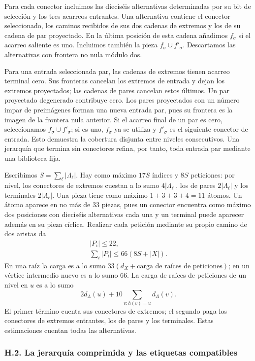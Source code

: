 \documentclass[spanish,11pt,a4paper]{article}
\begin{document}
Para cada conector incluimos las dieciséis alternativas determinadas por su bit de selección y los tres acarreos entrantes. Una alternativa contiene el conector seleccionado, los caminos recibidos de sus dos cadenas de extremos y los de su cadena de par proyectado. En la última posición de esta cadena añadimos \(f_\sigma\) si el acarreo saliente es uno. Incluimos también la pieza \(f_\sigma\cup f'_\sigma\). Descartamos las alternativas con frontera no nula módulo dos.

Para una entrada seleccionada par, las cadenas de extremos tienen acarreo terminal cero. Sus fronteras cancelan los extremos de entrada y dejan los extremos proyectados; las cadenas de pares cancelan estos últimos. Un par proyectado degenerado contribuye cero. Los pares proyectados con un número impar de preimágenes forman una nueva entrada par, pues su frontera es la imagen de la frontera nula anterior. Si el acarreo final de un par es cero, seleccionamos \(f_\sigma\cup f'_\sigma\); si es uno, \(f_\sigma\) ya se utiliza y \(f'_\sigma\) es el siguiente conector de entrada. Esto demuestra la cobertura disjunta entre niveles consecutivos. Una jerarquía que termina sin conectores refina, por tanto, toda entrada par mediante una biblioteca fija.

Escribimos \(S=\sum_\ell|\Lambda_\ell|\). Hay como máximo \(17S\) índices y \(8S\) peticiones: por nivel, los conectores de extremos cuestan a lo sumo \(4|\Lambda_\ell|\), los de pares \(2|\Lambda_\ell|\) y los terminales \(2|\Lambda_\ell|\). Una pieza tiene como máximo \(1+3+3+4=11\) átomos. Un átomo aparece en no más de \(33\) piezas, pues un conector encuentra como máximo dos posiciones con dieciséis alternativas cada una y un terminal puede aparecer además en su pieza cíclica. Realizar cada petición mediante su propio camino de dos aristas da \[\begin{gathered}
|P_i|\le22,\\
\sum_i|P_i|\le66(8S+|X|).
\end{gathered}\] En una raíz la carga es a lo sumo \(33(d_X+\text{carga de raíces de peticiones})\); en un vértice intermedio nuevo es a lo sumo \(66\). La carga de raíces de peticiones de un nivel en \(u\) es a lo sumo \[2d_\Lambda(u)+10\sum_{v:h(v)=u}d_\Lambda(v).\] El primer término cuenta sus conectores de extremos; el segundo paga los conectores de extremos entrantes, los de pares y los terminales. Estas estimaciones cuentan todas las alternativas.

\subsubsection{H.2. La jerarquía comprimida y las etiquetas compatibles}\label{h.2.-la-jerarquuxeda-comprimida-y-las-etiquetas-compatibles}
\end{document}

